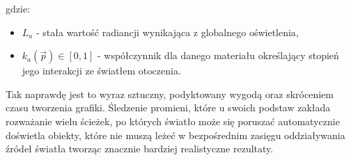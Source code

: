 gdzie:
\begin{itemize}
\item[] $L_a$ - stała wartość radiancji wynikająca z globalnego oświetlenia,
\item[] $k_a(\vec{p}) \in [0, 1]$ - współczynnik dla danego materiału określający stopień jego interakcji ze światłem otoczenia.
\end{itemize}
Tak naprawdę jest to wyraz sztuczny, podyktowany wygodą oraz skróceniem czasu tworzenia grafiki. Śledzenie promieni, które u swoich podstaw zakłada rozważanie wielu ścieżek, po których światło może się poruszać automatycznie doświetla obiekty, które nie muszą leżeć w bezpośrednim zasięgu oddziaływania źródeł światła tworząc znacznie bardziej realistyczne rezultaty. 
